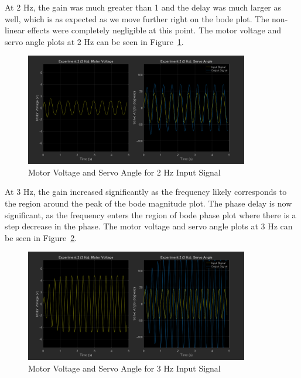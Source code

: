 \documentclass[12pt]{article}
\begin{document}
At 2 Hz, the gain was much greater than 1 and the delay was much larger as well, which is as expected as we move further right on the bode plot. The non-linear effects were completely negligible at this point. The motor voltage and servo angle plots at 2 Hz can be seen in Figure~\ref{fig:exp2_2}.
\begin{figure}[h!]
    \centering
    \includegraphics[width=0.87\textwidth]{exp2_2}
    \caption{\label{fig:exp2_2}Motor Voltage and Servo Angle for 2 Hz Input Signal}
\end{figure}

At 3 Hz, the gain increased significantly as the frequency likely corresponds to the region around the peak of the bode magnitude plot. The phase delay is now significant, as the frequency enters the region of bode phase plot where there is a step decrease in the phase. The motor voltage and servo angle plots at 3 Hz can be seen in Figure~\ref{fig:exp2_3}.
\begin{figure}[h!]
    \centering
    \includegraphics[width=0.87\textwidth]{exp2_3}
    \caption{\label{fig:exp2_3}Motor Voltage and Servo Angle for 3 Hz Input Signal}
\end{figure}
\end{document}
